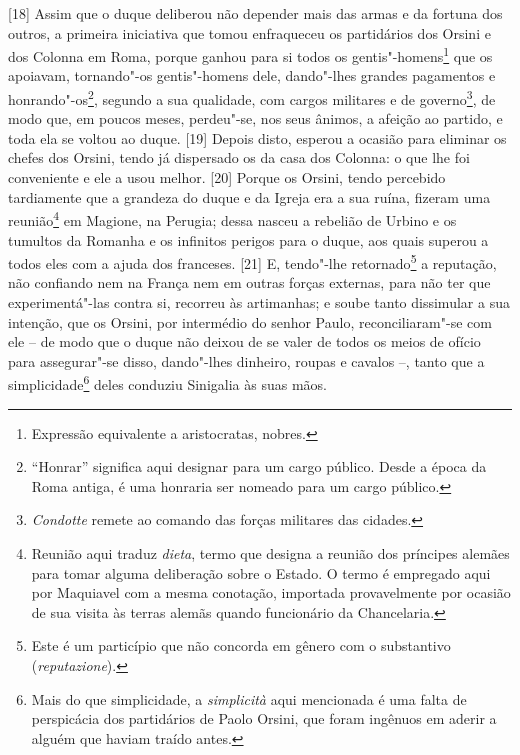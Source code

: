{[}18{]} Assim que o duque deliberou não depender mais das armas e da
fortuna dos outros, a primeira iniciativa que tomou enfraqueceu os
partidários dos Orsini e dos Colonna em Roma, porque ganhou para si
todos os gentis"-homens\footnote{Expressão equivalente a aristocratas,
  nobres.} que os apoiavam, tornando"-os gentis"-homens dele, dando"-lhes
grandes pagamentos e honrando"-os\footnote{``Honrar'' significa aqui designar
  para um cargo público. Desde a época da Roma antiga, é uma honraria
  ser nomeado para um cargo público.}, segundo a sua qualidade, com
cargos militares e de governo\footnote{\emph{Condotte} remete ao comando
  das forças militares das cidades.}, de modo que, em poucos meses,
perdeu"-se, nos seus ânimos, a afeição ao partido, e toda ela se voltou
ao duque. {[}19{]} Depois disto, esperou a ocasião para eliminar os
chefes dos Orsini, tendo já dispersado os da casa dos Colonna: o que lhe
foi conveniente e ele a usou melhor. {[}20{]} Porque os Orsini, tendo
percebido tardiamente que a grandeza do duque e da Igreja era a sua
ruína, fizeram uma reunião\footnote{Reunião aqui traduz \emph{dieta},
  termo que designa a reunião dos príncipes alemães para tomar alguma
  deliberação sobre o Estado. O termo é empregado aqui por Maquiavel com
  a mesma conotação, importada provavelmente por ocasião de sua visita
  às terras alemãs quando funcionário da Chancelaria.} em Magione, na
Perugia; dessa nasceu a rebelião de Urbino e os tumultos da Romanha e os
infinitos perigos para o duque, aos quais superou a todos eles com a
ajuda dos franceses. {[}21{]} E, tendo"-lhe retornado\footnote{Este é um
  particípio que não concorda em gênero com o substantivo
  (\emph{reputazione}).} a reputação, não confiando nem na França nem em
outras forças externas, para não ter que experimentá"-las contra si,
recorreu às artimanhas; e soube tanto dissimular a sua intenção, que os
Orsini, por intermédio do senhor Paulo, reconciliaram"-se com ele -- de
modo que o duque não deixou de se valer de todos os meios de ofício para
assegurar"-se disso, dando"-lhes dinheiro, roupas e cavalos --, tanto que
a simplicidade\footnote{Mais do que simplicidade, a \emph{simplicità}
  aqui mencionada é uma falta de perspicácia dos partidários de Paolo
  Orsini, que foram ingênuos em aderir a alguém que haviam traído antes.}
deles conduziu Sinigalia às suas mãos.

